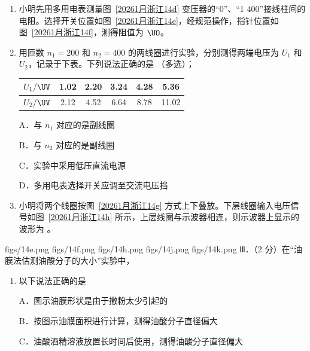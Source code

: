 \documentclass[\gkver]{gaokaozhenti}
\begin{document}
\begin{enumerate}
\begin{enumerate}
	\item
	小明先用多用电表测量图~\ref{20261月浙江14d} 变压器的“0”、“1 400”接线柱间的电阻。选择开关位置如图~\ref{20261月浙江14e}，经规范操作，指针位置如图~\ref{20261月浙江14f}，测得阻值为  $\UO$。
	\item
	用匝数 $n_{1} = 200$ 和 $n_{2} = 400$ 的两线圈进行实验，分别测得两端电压为 $U_{1}$ 和 $U_{2}$，记录于下表。下列说法正确的是  （多选）；

	\begin{center}
	\begin{tabular}{|c|c|c|c|c|c|}
	\hline
	$U_{1}/\UV$ & 1.02 & 2.20 & 3.24 & 4.28 & 5.36 \\ \hline
	$U_{2}/\UV$ & 2.12 & 4.52 & 6.64 & 8.78 & 11.02 \\ \hline
	\end{tabular}
	\end{center}

	A．与 $n_{1}$ 对应的是副线圈

	B．与 $n_{2}$ 对应的是副线圈

	C．实验中采用低压直流电源

	D．多用电表选择开关应调至交流电压挡

	\item
	小明将两个线圈按图~\ref{20261月浙江14g} 方式上下叠放。下层线圈输入电压信号如图~\ref{20261月浙江14h} 所示，上层线圈与示波器相连，则示波器上显示的波形为  。
\end{enumerate}
{figs/14e.png}
{figs/14f.png}
{figs/14h.png}
{figs/14j.png}
{figs/14k.png}
Ⅲ．（2 分）在“油膜法估测油酸分子的大小”实验中，

\begin{enumerate}
	\item
	以下说法正确的是 

	A．图示油膜形状是由于撒粉太少引起的

	B．按图示油膜面积进行计算，测得油酸分子直径偏大

	C．油酸酒精溶液放置长时间后使用，测得油酸分子直径偏大


\end{enumerate}
\end{enumerate}
\end{document}
